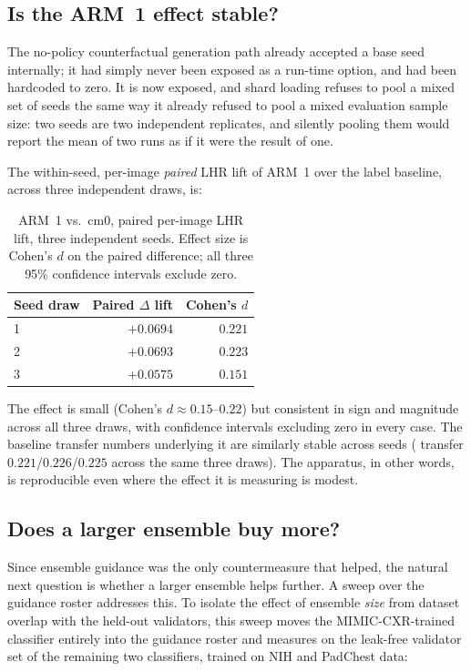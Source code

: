 \subsection{Is the ARM~1 effect stable?}

The no-policy counterfactual generation path already accepted a base seed
internally; it had simply never been exposed as a run-time option, and
had been hardcoded to zero. It is now exposed, and shard loading refuses
to pool a mixed set of seeds the same way it already refused to pool a
mixed evaluation sample size: two seeds are two independent replicates,
and silently pooling them would report the mean of two runs as if it
were the result of one.

The within-seed, per-image \emph{paired} LHR lift of ARM~1 over the label
baseline, across three independent draws, is:

\begin{table}[h]
\centering
\caption[Seed replication of the ensemble countermeasure]{ARM~1 vs.\ cm0,
paired per-image LHR lift, three independent seeds. Effect size is Cohen's
$d$ on the paired difference; all three 95\% confidence intervals exclude
zero.}
\label{tab:seed_repl}
\begin{tabular}{@{}lrr@{}}
\toprule
\textbf{Seed draw} & \textbf{Paired $\Delta$ lift} & \textbf{Cohen's $d$} \\
\midrule
1 & $+0.0694$ & $0.221$ \\
2 & $+0.0693$ & $0.223$ \\
3 & $+0.0575$ & $0.151$ \\
\bottomrule
\end{tabular}
\end{table}

The effect is small (Cohen's $d \approx 0.15$--$0.22$) but consistent in
sign and magnitude across all three draws, with confidence intervals
excluding zero in every case. The baseline transfer numbers underlying it
are similarly stable across seeds (\ntop{} transfer $0.221$/$0.226$/$0.225$
across the same three draws). The apparatus, in other words, is
reproducible even where the effect it is measuring is modest.

\subsection{Does a larger ensemble buy more?}

Since ensemble guidance was the only countermeasure that helped, the
natural next question is whether a larger ensemble helps further. A
sweep over the guidance roster addresses this. To isolate the effect of
ensemble \emph{size} from dataset overlap with the held-out validators,
this sweep moves the MIMIC-CXR-trained classifier entirely into the
guidance roster and measures on the leak-free validator set of the
remaining two classifiers, trained on NIH and PadChest data:

